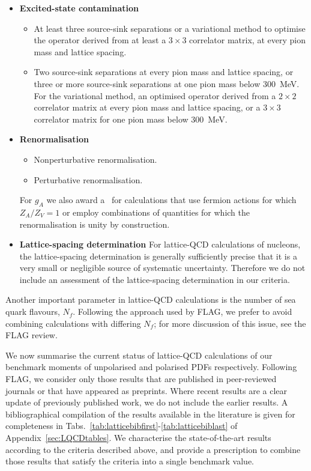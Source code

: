 \begin{itemize}
\item {\bfseries Excited-state contamination}
%
\begin{itemize}
%
\item[\bstar] At least three source-sink separations or a variational method 
to optimise the operator derived from at least a $3\times 3$ correlator matrix, 
at every pion mass and lattice spacing.
% 
\item[\bcirc] Two source-sink separations at every pion mass and lattice 
spacing, or three or more source-sink separations at one pion mass below 
300~MeV.
%
For the variational method, an optimised operator derived from a $2\times 2$ 
correlator matrix at every pion mass and lattice spacing, or a $3\times 3$ 
correlator matrix for one pion mass below 300~MeV.
%
\end{itemize}

\item {\bfseries Renormalisation}
\begin{itemize}
%
\item[\bstar] Nonperturbative renormalisation.
%
\item[\bcirc] Perturbative renormalisation.
%
\end{itemize}
%
For $g_A$ we also award a \bstar~for calculations that use fermion actions 
for which $Z_A/Z_V=1$ or employ combinations of quantities for which the 
renormalisation is unity by construction.

\item {\bfseries Lattice-spacing determination}
For lattice-QCD calculations of nucleons, the lattice-spacing determination is 
generally sufficiently precise that it is a very small or negligible source
of systematic uncertainty. 
%
Therefore we do not include an assessment of the lattice-spacing
determination in our criteria.

\end{itemize}

Another important parameter in lattice-QCD calculations is the number of sea quark flavours, $N_f$. Following the approach used by FLAG, we prefer to avoid combining calculations with differing $N_f$; for more discussion of this issue, see the FLAG review.

We now summarise the current status of lattice-QCD calculations of
our benchmark moments of unpolarised and polarised PDFs respectively.
%
Following FLAG, we consider only those results that are published in 
peer-reviewed journals or that have appeared as preprints. 
%
Where recent results are a clear update of previously published work, we do 
not include the earlier results.
%
A bibliographical compilation of the results available in the literature 
is given for completeness in 
Tabs.~\ref{tab:latticebibfirst}-\ref{tab:latticebiblast} 
of Appendix~\ref{sec:LQCDtables}.
%
We characterise the state-of-the-art results according to the criteria 
described above, and provide a prescription to combine those results that satisfy 
the criteria into a single benchmark value.

